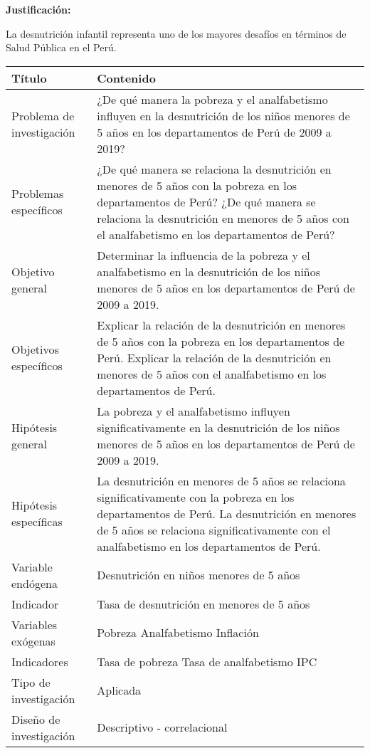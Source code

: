 \documentclass[
  man,
  floatsintext,
  longtable,
  a4paper,
  nolmodern,
  notxfonts,
  notimes,
  colorlinks=true,linkcolor=blue,citecolor=blue,urlcolor=blue]{apa7}
\begin{document}
\textbf{Justificación:}

La desnutrición infantil representa uno de los mayores desafíos en
términos de Salud Pública en el Perú.

\begin{longtable}[]{@{}
  >{\raggedright\arraybackslash}p{}
  >{\raggedright\arraybackslash}p{}@{}}
\toprule\noalign{}
\begin{minipage}[b]{\linewidth}\raggedright
Título
\end{minipage} & \begin{minipage}[b]{\linewidth}\raggedright
Contenido
\end{minipage} \\
\midrule\noalign{}
\endhead
\bottomrule\noalign{}
\endlastfoot
Problema de investigación & ¿De qué manera la pobreza y el analfabetismo
influyen en la desnutrición de los niños menores de 5 años en los
departamentos de Perú de 2009 a 2019? \\
Problemas específicos & ¿De qué manera se relaciona la desnutrición en
menores de 5 años con la pobreza en los departamentos de Perú? ¿De qué
manera se relaciona la desnutrición en menores de 5 años con el
analfabetismo en los departamentos de Perú? \\
Objetivo general & Determinar la influencia de la pobreza y el
analfabetismo en la desnutrición de los niños menores de 5 años en los
departamentos de Perú de 2009 a 2019. \\
Objetivos específicos & Explicar la relación de la desnutrición en
menores de 5 años con la pobreza en los departamentos de Perú. Explicar
la relación de la desnutrición en menores de 5 años con el analfabetismo
en los departamentos de Perú. \\
Hipótesis general & La pobreza y el analfabetismo influyen
significativamente en la desnutrición de los niños menores de 5 años en
los departamentos de Perú de 2009 a 2019. \\
Hipótesis específicas & La desnutrición en menores de 5 años se
relaciona significativamente con la pobreza en los departamentos de
Perú. La desnutrición en menores de 5 años se relaciona
significativamente con el analfabetismo en los departamentos de Perú. \\
Variable endógena & Desnutrición en niños menores de 5 años \\
Indicador & Tasa de desnutrición en menores de 5 años \\
Variables exógenas & Pobreza Analfabetismo Inflación \\
Indicadores & Tasa de pobreza Tasa de analfabetismo IPC \\
Tipo de investigación & Aplicada \\
Diseño de investigación & Descriptivo - correlacional \\
\end{longtable}
\end{document}
